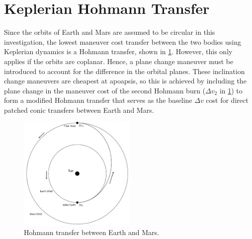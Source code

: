 \section{Keplerian Hohmann Transfer}
Since the orbits of Earth and Mars are assumed to be circular in this investigation, the lowest
maneuver cost transfer between the two bodies using Keplerian dynamics is a Hohmann transfer, shown
in \cref{fig:Hohmann}. However, this only applies if the orbits are coplanar. Hence, a plane change
maneuver must be introduced to account for the difference in the orbital planes. These inclination
change maneuvers are cheapest at apoapsis, so this is achieved by including the plane change in the
maneuver cost of the second Hohmann burn ($\Delta v_{2}$ in \cref{fig:Hohmann}) to form a modified
Hohmann transfer that serves as the baseline $\Delta v$ cost for direct patched conic transfers
between Earth and Mars.

\begin{figure}[ht]
    \centering
    \includegraphics[width=0.5\textwidth]{figures/Hohmann.jpg}
    \caption{Hohmann transfer between Earth and Mars.}
    \label{fig:Hohmann}
\end{figure}

